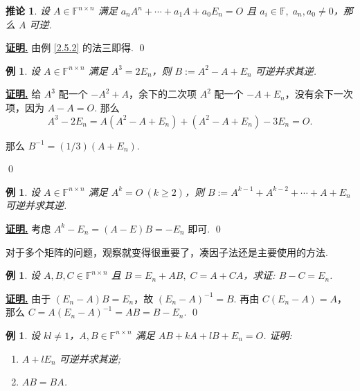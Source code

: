 \documentclass[10pt,openany]{article}
\theoremstyle{thmstyle} %
\theoremstyle{defstyle} %
\newtheorem{corollary}[theorem]{推论}
\theoremstyle{prostyle} %
\theoremstyle{exastyle}
\newtheorem{example}[theorem]{例}
\theoremstyle{remstyle}
\renewenvironment{proof}[1][证明]{\par\underline{\textbf{#1.}} \;\fangsong}{\qed\par}
\newcommand{\F}{\mathbb{F}}
\newcommand{\n}{^{n \times n}}
\begin{document}
\begin{corollary}
	设 \(  A \in \F\n \) 满足 \( a_nA^n+\cdots+a_1A+a_0E_n=O \) 且 \( a_i \in \F, \; a_n,a_0 \neq 0 \)，那么 \( A \) 可逆.
\end{corollary}

\begin{proof}
	由例 \ref{2.5.2} 的法三即得.
\end{proof}

\begin{example}
	设 \(  A \in \F\n \) 满足 \( A^3=2E_n \)，则 \( B:=A^2-A+E_n \) 可逆并求其逆.
\end{example}

\begin{proof}
     给 \( A^3 \) 配一个 \( -A^2+A \)，余下的二次项 \( A^2 \) 配一个 \( -A+E_n \)，没有余下一次项，因为 \( A-A=O \). 那么
     \[ A^3-2E_n=A(A^2-A+E_n)+(A^2-A+E_n)-3E_n=O. \]
     
     那么 \( B^{-1}=(1/3) (A+E_n) \).
	
\end{proof}

\begin{example}
	设 \(  A \in \F\n \) 满足 \( A^k=O \ (k \geq 2) \)，则 \( B:=A^{k-1}+A^{k-2}+\cdots+A+E_n \) 可逆并求其逆.
\end{example}

\begin{proof}
	考虑 \( A^k-E_n=(A-E)B=-E_n \) 即可.
\end{proof}


对于多个矩阵的问题，观察就变得很重要了，凑因子法还是主要使用的方法. 

\begin{example}
	设 \( A,B,C \in \F\n \) 且 \( B=E_n+AB, \; C=A+CA \)，求证: \( B-C=E_n \).
\end{example}

\begin{proof}
	由于 \( (E_n-A)B=E_n \)，故 \( (E_n-A)^{-1}=B \). 再由 \( C(E_n-A)=A \)，那么 \( C=A(E_n-A)^{-1}=AB=B-E_n \).
\end{proof}


\begin{example} \label{2.5.7}
	设 \( kl \ne 1 \)，\( A, B \in \F\n \) 满足 \( AB + kA + lB + E_n = O \). 证明:
	\begin{enumerate}[(1)]
		\item \( A + lE_n \) 可逆并求其逆;
		\item \( AB = BA \).
	\end{enumerate}
\end{example}
\end{document}
